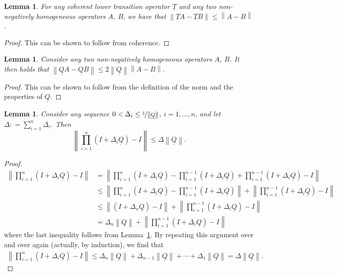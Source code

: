 \documentclass[a4paper,reqno]{amsart}
\newtheorem{lemma}[theorem]{Lemma}
\newcommand{\lt}{\underline{T}}
\newcommand{\lrate}{\underline{Q}}
\newcommand{\norm}[1]{\left\lVert #1 \right\rVert}
\newcommand{\coloneqq}{:\!=}
\begin{document}
\begin{lemma}\label{lemma:differencenormofcoherenttrans}
For any coherent lower transition operator $\lt$ and any two non-negatively homogeneous operators $A$, $B$, we have that $\norm{\lt A-\lt B}\leq \norm{A-B}$.
\end{lemma}
\begin{proof}
This can be shown to follow from coherence.
\end{proof}

\begin{lemma}\label{lemma:differencenormofcoherenttransrate}
Consider any two non-negatively homogeneous operators $A$, $B$. It then holds that $\norm{\lrate A-\lrate B}\leq 2\norm{\lrate}\norm{A-B}$.
\end{lemma}
\begin{proof}
This can be shown to follow from the definition of the norm and the properties of $\lrate$.
\end{proof}


\begin{lemma}\label{lemma:justtheindicator}
Consider any sequence $0<\Delta_i\leq\nicefrac{1}{\norm{\lrate}}$, $i=1,\dots,n$, and let $\Delta\coloneqq\sum_{i=1}^n\Delta_i$. Then
\begin{equation*}
\norm{\prod_{i=1}^n(I+\Delta_i\lrate)-I}\leq\Delta\norm{\lrate}.
\end{equation*}
\end{lemma}
\begin{proof}
\begin{align*}
\norm{\prod_{i=1}^n(I+\Delta_i\lrate)-I}
&=\norm{\prod_{i=1}^n(I+\Delta_i\lrate)-\prod_{i=1}^{n-1}(I+\Delta_i\lrate)+\prod_{i=1}^{n-1}(I+\Delta_i\lrate)-I}\\
&\leq\norm{\prod_{i=1}^n(I+\Delta_i\lrate)-\prod_{i=1}^{n-1}(I+\Delta_i\lrate)}+\norm{\prod_{i=1}^{n-1}(I+\Delta_i\lrate)-I}\\
&\leq\norm{(I+\Delta_n\lrate)-I}+\norm{\prod_{i=1}^{n-1}(I+\Delta_i\lrate)-I}\\
&=\Delta_n\norm{\lrate}+\norm{\prod_{i=1}^{n-1}(I+\Delta_i\lrate)-I}
\end{align*}
where the last inequality follows from Lemma~\ref{lemma:differencenormofcoherenttrans}. By repeating this argument over and over again (actually, by induction), we find that
\begin{align*}
\norm{\prod_{i=1}^n(I+\Delta_i\lrate)-I}
\leq \Delta_n\norm{\lrate} +\Delta_{n-1}\norm{\lrate}+\cdots
+\Delta_1\norm{\lrate}
=\Delta\norm{\lrate}.
\end{align*}
\end{proof}
\end{document}
